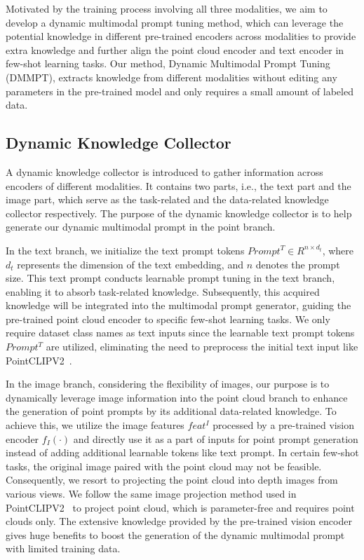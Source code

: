 \documentclass{ecai}
\begin{document}
Motivated by the training process involving all three modalities, we aim to develop a dynamic multimodal prompt tuning method, which can leverage the potential knowledge in different pre-trained encoders across modalities to provide extra knowledge and further align the point cloud encoder and text encoder in few-shot learning tasks. Our method, Dynamic Multimodal Prompt Tuning (DMMPT), extracts knowledge from different modalities without editing any parameters in the pre-trained model and only requires a small amount of labeled data.

\subsection{Dynamic Knowledge Collector}
A dynamic knowledge collector is introduced to gather information across encoders of different modalities. It contains two parts, i.e., the text part and the image part, which serve as the task-related and the data-related knowledge collector respectively. The purpose of the dynamic knowledge collector is to help generate our dynamic multimodal prompt in the point branch.

In the text branch, we initialize the text prompt tokens $Prompt^T \in R^{n \times d_t}$, where $d_t$ represents the dimension of the text embedding, and $n$ denotes the prompt size. This text prompt conducts learnable prompt tuning in the text branch, enabling it to absorb task-related knowledge. Subsequently, this acquired knowledge will be integrated into the multimodal prompt generator, guiding the pre-trained point cloud encoder to specific few-shot learning tasks. We only require dataset class names as text inputs since the learnable text prompt tokens $Prompt^T$ are utilized, eliminating the need to preprocess the initial text input like PointCLIPV2~\cite{zhu2023pointclip}.

In the image branch, considering the flexibility of images, our purpose is to dynamically leverage image information into the point cloud branch to enhance the generation of point prompts by its additional data-related knowledge. To achieve this, we utilize the image features $feat^I$ processed by a pre-trained vision encoder $f_I(\cdot)$ and directly use it as a part of inputs for point prompt generation instead of adding additional learnable tokens like text prompt. In certain few-shot tasks, the original image paired with the point cloud may not be feasible. Consequently, we resort to projecting the point cloud into depth images from various views. We follow the same image projection method used
in PointCLIPV2~\cite{zhu2023pointclip} to project point cloud, which is parameter-free and requires point clouds only. The extensive knowledge provided by the pre-trained vision encoder gives huge benefits to boost the generation of the dynamic multimodal prompt with limited training data. 
\end{document}

